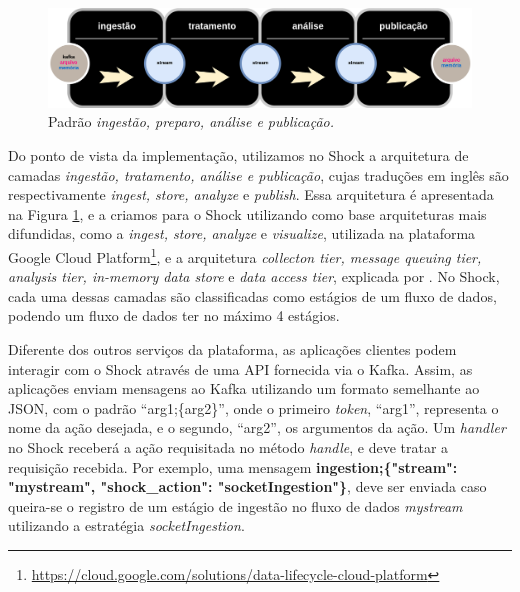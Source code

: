 \begin{figure}[hbt]
  \centering
  \includegraphics[scale=0.35]{figuras/arquiteturaforensic.png}
  \caption{Padrão \textit{ingestão, preparo, análise e publicação.}}
  \label{fig:ingeststore}
\end{figure}

Do ponto de vista da implementação, utilizamos no Shock a arquitetura de camadas
\textit{ingestão, tratamento, análise e publicação}, cujas traduções em inglês são
respectivamente \textit{ingest, store, analyze} e \textit{publish}. Essa arquitetura
é apresentada na Figura \ref{fig:ingeststore}, e a criamos para o Shock utilizando
como base arquiteturas mais difundidas, como a \textit{ingest, store, analyze} e
\textit{visualize}, utilizada na plataforma Google Cloud
Platform\footnote{\url{https://cloud.google.com/solutions/data-lifecycle-cloud-platform}},
e a arquitetura \textit{collecton tier, message queuing tier, analysis tier,
in-memory data store} e \textit{data access tier}, explicada por
. No Shock, cada uma dessas camadas são
classificadas como estágios de um fluxo de dados, podendo um
fluxo de dados ter no máximo 4 estágios.

Diferente dos outros serviços da plataforma, as aplicações clientes podem interagir
com o Shock através de uma API fornecida via o Kafka. Assim, as aplicações enviam
mensagens ao Kafka utilizando um formato semelhante ao JSON, com o padrão ``arg1;\{arg2\}'',
onde o primeiro \textit{token}, ``arg1'', representa o nome
da ação desejada, e o segundo, ``arg2'', os argumentos da ação. Um
\textit{handler} no Shock receberá a ação requisitada no método
\textit{handle}, e deve tratar a requisição recebida. Por exemplo, uma mensagem
\small{\textbf{ingestion;\{"stream": "mystream", "shock\_action": "socketIngestion"\}}},
deve ser enviada caso queira-se o registro de um estágio de ingestão no
fluxo de dados \textit{mystream} utilizando a estratégia \textit{socketIngestion}.

